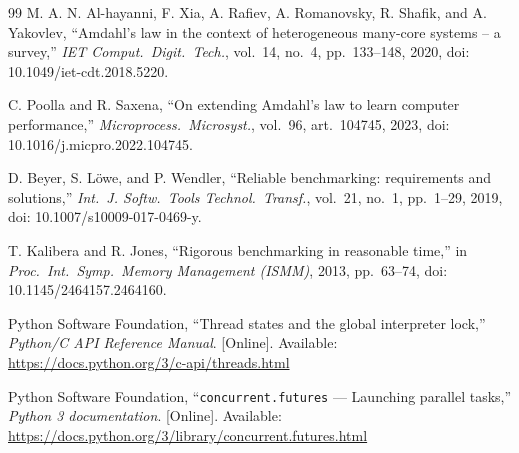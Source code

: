 \documentclass[conference]{IEEEtran}
\newcommand{\code}[1]{\texttt{#1}}
\begin{document}
\begin{thebibliography}{99}
M. A. N. Al-hayanni, F. Xia, A. Rafiev, A. Romanovsky, R. Shafik, and
A. Yakovlev, ``Amdahl's law in the context of heterogeneous many-core
systems -- a survey,'' \emph{IET Comput.\ Digit.\ Tech.}, vol.~14,
no.~4, pp.~133--148, 2020, doi: 10.1049/iet-cdt.2018.5220.

C. Poolla and R. Saxena, ``On extending Amdahl's law to learn computer
performance,'' \emph{Microprocess.\ Microsyst.}, vol.~96, art.~104745,
2023, doi: 10.1016/j.micpro.2022.104745.

D. Beyer, S. L\"owe, and P. Wendler, ``Reliable benchmarking:
requirements and solutions,'' \emph{Int.\ J. Softw.\ Tools Technol.\
Transf.}, vol.~21, no.~1, pp.~1--29, 2019, doi:
10.1007/s10009-017-0469-y.

T. Kalibera and R. Jones, ``Rigorous benchmarking in reasonable time,''
in \emph{Proc.\ Int.\ Symp.\ Memory Management (ISMM)}, 2013,
pp.~63--74, doi: 10.1145/2464157.2464160.

Python Software Foundation, ``Thread states and the global interpreter
lock,'' \emph{Python/C API Reference Manual}. [Online]. Available:
\url{https://docs.python.org/3/c-api/threads.html}

Python Software Foundation, ``\code{concurrent.futures} --- Launching
parallel tasks,'' \emph{Python 3 documentation}. [Online]. Available:
\url{https://docs.python.org/3/library/concurrent.futures.html}

\end{thebibliography}
\end{document}
